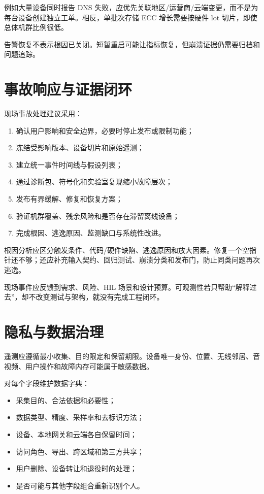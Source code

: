 例如大量设备同时报告 DNS 失败，应优先关联地区/运营商/云端变更，而不是为每台设备创建独立工单。相反，单批次存储 ECC 增长需要按硬件 lot 切片，即使总体机群比例很低。

告警恢复不表示根因已关闭。短暂重启可能让指标恢复，但崩溃证据仍需要归档和问题追踪。

\section{事故响应与证据闭环}

现场事故处理建议采用：

\begin{enumerate}
  \item 确认用户影响和安全边界，必要时停止发布或限制功能；
  \item 冻结受影响版本、设备切片和原始遥测；
  \item 建立统一事件时间线与假设列表；
  \item 通过诊断包、符号化和实验室复现缩小故障层次；
  \item 发布有界缓解、修复和恢复方案；
  \item 验证机群覆盖、残余风险和是否存在滞留离线设备；
  \item 完成根因、逃逸原因、监测缺口与系统性改进。
\end{enumerate}

根因分析应区分触发条件、代码/硬件缺陷、逃逸原因和放大因素。修复一个空指针还不够；还应补充输入契约、回归测试、崩溃分类和发布门，防止同类问题再次逃逸。

现场事件应反馈到需求、风险、HIL 场景和设计预算。可观测性若只帮助“解释过去”，却不改变测试与架构，就没有完成工程闭环。

\section{隐私与数据治理}

遥测应遵循最小收集、目的限定和保留期限。设备唯一身份、位置、无线邻居、音视频、用户操作和故障内存可能属于敏感数据。

对每个字段维护数据字典：

\begin{itemize}
  \item 采集目的、合法依据和必要性；
  \item 数据类型、精度、采样率和去标识方法；
  \item 设备、本地网关和云端各自保留时间；
  \item 访问角色、导出、跨区域和第三方共享；
  \item 用户删除、设备转让和退役时的处理；
  \item 是否可能与其他字段组合重新识别个人。
\end{itemize}

